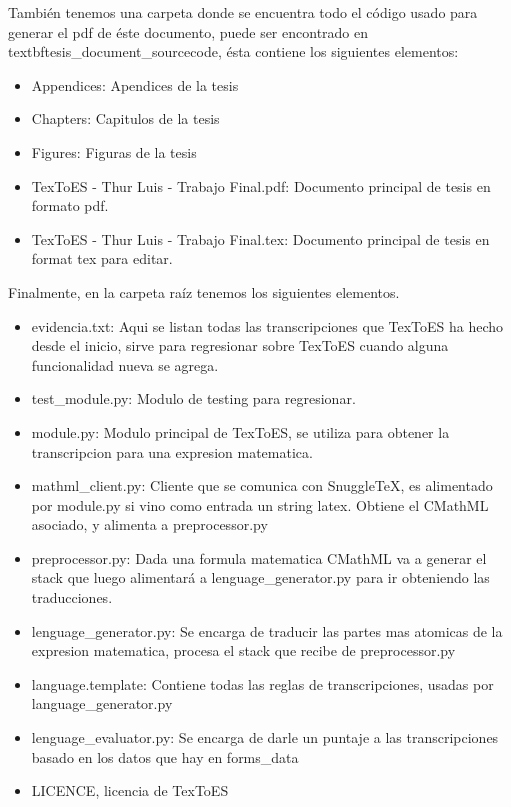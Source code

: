 También tenemos una carpeta donde se encuentra todo el código usado para generar el pdf de éste documento, puede ser encontrado en textbf{tesis\_document\_sourcecode}, ésta contiene los siguientes elementos:
\begin{itemize}
\item Appendices: Apendices de la tesis
\item Chapters: Capitulos de la tesis
\item Figures: Figuras de la tesis
\item TexToES - Thur Luis - Trabajo Final.pdf: Documento principal de tesis en formato pdf.
\item TexToES - Thur Luis - Trabajo Final.tex: Documento principal de tesis en format tex para editar.
\end{itemize}

Finalmente, en la carpeta raíz tenemos los siguientes elementos.

\begin{itemize}
\item evidencia.txt: Aqui se listan todas las transcripciones que TexToES ha hecho desde el inicio, sirve para regresionar sobre TexToES cuando alguna funcionalidad nueva se agrega.
\item test\_module.py: Modulo de testing para regresionar.
\item module.py: Modulo principal de TexToES, se utiliza para obtener la transcripcion para una expresion matematica.
\item mathml\_client.py: Cliente que se comunica con SnuggleTeX, es alimentado por module.py si vino como entrada un string latex. Obtiene el CMathML asociado, y alimenta a preprocessor.py
\item preprocessor.py: Dada una formula matematica CMathML va a generar el stack que luego alimentará a lenguage\_generator.py para ir obteniendo las traducciones.
\item lenguage\_generator.py: Se encarga de traducir las partes mas atomicas de la expresion matematica, procesa el stack que recibe de preprocessor.py
\item language.template: Contiene todas las reglas de transcripciones, usadas por language\_generator.py
\item lenguage\_evaluator.py: Se encarga de darle un puntaje a las transcripciones basado en los datos que hay en forms\_data
\item LICENCE, licencia de TexToES
\end{itemize}

